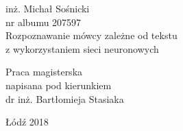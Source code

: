 \begin{titlepage}
\begin{center}
{\Large inż. Michał Sośnicki\\nr albumu 207597\\}
\vspace{2cm}
{\huge Rozpoznawanie mówcy zależne od tekstu \\z wykorzystaniem sieci neuronowych}
\end{center}
\vspace{3cm}
\hfill
\begin{minipage}{.55\columnwidth}
Praca magisterska\\
napisana pod kierunkiem\\
dr inż. Bartłomieja Stasiaka
\end{minipage}
\vfill
\begin{center}
Łódź 2018
\end{center}
\end{titlepage}
